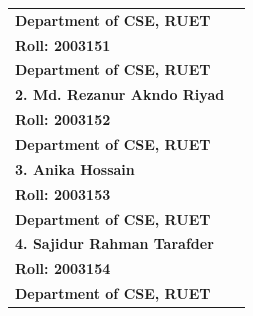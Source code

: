 \documentclass[12pt,a4paper]{article}
\begin{document}
\begin{titlepage}
\begin{table}[h!]
\begin{tabular}{|p{7.5cm}|p{7.5cm}|}
{{        \vspace{0.1cm}
        \textbf{Department of CSE, RUET}}} \\
        \large \quad \textbf{\hspace{0.2cm}Roll: 2003151} & \\
        \large \quad \textbf{\hspace{0.2cm}Department of CSE, RUET} & \\
        \cline{1-1}
        \large \textbf{2. Md. Rezanur Akndo Riyad} & \\
        \large \quad \textbf{\hspace{0.2cm}Roll: 2003152} & \\
        \large \quad \textbf{\hspace{0.2cm}Department of CSE, RUET} & \\
        \cline{1-1}
        \large \textbf{3. Anika Hossain} & \\
        \large \quad \textbf{\hspace{0.2cm}Roll: 2003153} & \\
        \large \quad \textbf{\hspace{0.2cm}Department of CSE, RUET} & \\
        \cline{1-1}
        \large \textbf{4. Sajidur Rahman Tarafder} & \\
        \large \quad \textbf{\hspace{0.2cm}Roll: 2003154} & \\
        \large \quad \textbf{\hspace{0.2cm}Department of CSE, RUET} & \\
        \hline
        
    \end{tabular}
    \end{table}
    
    \vspace{0.5cm}
\end{titlepage}

\pagestyle{reportstyle}
\newpage

\listoffigures
\newpage

\listoftables
\newpage

\tableofcontents
\newpage

\end{document}
